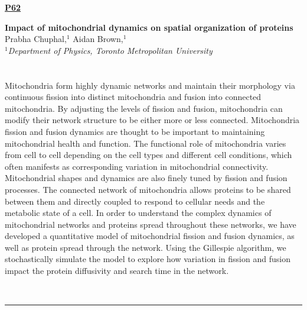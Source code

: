 \documentclass[titlepage,oneside,openany,10pt]{book}
\newenvironment{posterabs}[4] %
        {
	\begin{flushright}
                \underline{\textbf{#4}}
        \end{flushright}
        \textbf{#1}\\%
        #2\\%
        \textit{#3}\\\\%
        }
        {
        \\
        \noindent\rule{15cm}{0.5pt}%
        }
\begin{document}
\begin{posterabs}
	{Impact of mitochondrial dynamics on spatial organization of proteins}
	{Prabha Chuphal,$^{1}$ Aidan Brown,$^{1}$}
	{
	$^1$Department of Physics, Toronto Metropolitan University\\
	}
	{P62}
	Mitochondria form highly dynamic networks and maintain their morphology via continuous fission into distinct mitochondria and fusion into connected mitochondria. By adjusting the levels of fission and fusion, mitochondria can modify their network structure to be either more or less connected. Mitochondria fission and fusion dynamics are thought to be important to maintaining mitochondrial health and function. The functional role of mitochondria varies from cell to cell depending on the cell types and different cell conditions, which often manifests as corresponding variation in mitochondrial connectivity. Mitochondrial shapes and dynamics are also finely tuned by fission and fusion processes. The connected network of mitochondria allows proteins to be shared between them and directly coupled to respond to cellular needs and the metabolic state of a cell. In order to understand the complex dynamics of mitochondrial networks and proteins spread throughout these networks, we have developed a quantitative model of mitochondrial fission and fusion dynamics, as well as protein spread through the network. Using the Gillespie algorithm, we stochastically simulate the model to explore how variation in fission and fusion impact the protein diffusivity and search time in the network.
	\label{ChuphalP}
\end{posterabs}

\newpage
\end{document}
